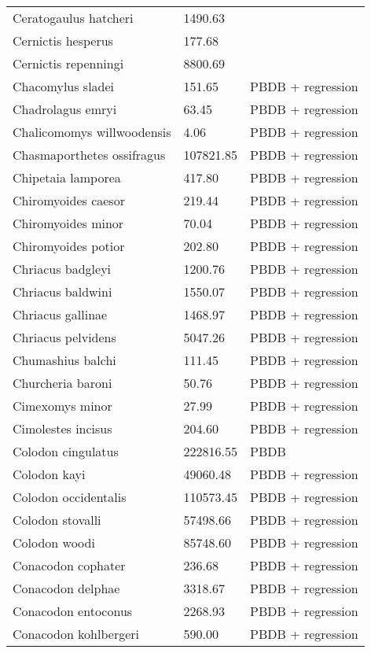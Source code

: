 \begin{center}
\begin{longtable}{p{} p{} p{} }
  Ceratogaulus hatcheri & 1490.63 & \cite{Cassiliano2008} \\ 
  Cernictis hesperus & 177.68 & \cite{Tomiya2013} \\ 
  Cernictis repenningi & 8800.69 & \cite{Hall1930} \\ 
  Chacomylus sladei & 151.65 & PBDB + regression \\ 
  Chadrolagus emryi & 63.45 & PBDB + regression \\ 
  Chalicomomys willwoodensis & 4.06 & PBDB + regression \\ 
  Chasmaporthetes ossifragus & 107821.85 & PBDB + regression \\ 
  Chipetaia lamporea & 417.80 & PBDB + regression \\ 
  Chiromyoides caesor & 219.44 & PBDB + regression \\ 
  Chiromyoides minor & 70.04 & PBDB + regression \\ 
  Chiromyoides potior & 202.80 & PBDB + regression \\ 
  Chriacus badgleyi & 1200.76 & PBDB + regression \\ 
  Chriacus baldwini & 1550.07 & PBDB + regression \\ 
  Chriacus gallinae & 1468.97 & PBDB + regression \\ 
  Chriacus pelvidens & 5047.26 & PBDB + regression \\ 
  Chumashius balchi & 111.45 & PBDB + regression \\ 
  Churcheria baroni & 50.76 & PBDB + regression \\ 
  Cimexomys minor & 27.99 & PBDB + regression \\ 
  Cimolestes incisus & 204.60 & PBDB + regression \\ 
  Colodon cingulatus & 222816.55 & PBDB \\ 
  Colodon kayi & 49060.48 & PBDB + regression \\ 
  Colodon occidentalis & 110573.45 & PBDB + regression \\ 
  Colodon stovalli & 57498.66 & PBDB + regression \\ 
  Colodon woodi & 85748.60 & PBDB + regression \\ 
  Conacodon cophater & 236.68 & PBDB + regression \\ 
  Conacodon delphae & 3318.67 & PBDB + regression \\ 
  Conacodon entoconus & 2268.93 & PBDB + regression \\ 
  Conacodon kohlbergeri & 590.00 & PBDB + regression \\ 

\end{longtable}
\end{center}
